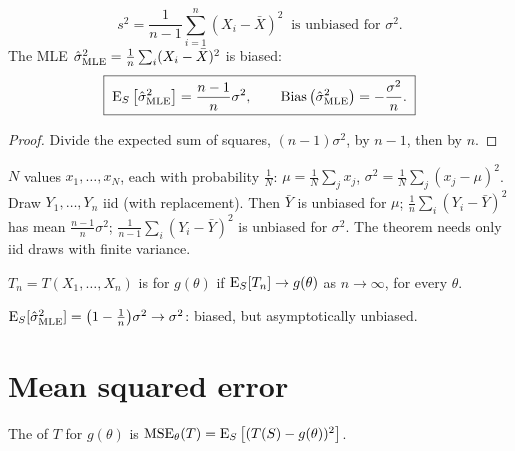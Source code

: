 \begin{corollary}
\[
  \boxed{\;s^2=\frac{1}{n-1}\sum_{i=1}^n(X_i-\bar X)^2\ \text{ is unbiased for }\sigma^2.\;}
\]
The MLE $\hat\sigma^2_{\mathrm{MLE}}=\frac1n\sum_i(X_i-\bar X)^2$ is biased:
\[
  \boxed{\;\operatorname{E}_S\big[\hat\sigma^2_{\mathrm{MLE}}\big]=\frac{n-1}{n}\sigma^2,\qquad\operatorname{Bias}\big(\hat\sigma^2_{\mathrm{MLE}}\big)=-\frac{\sigma^2}{n}.\;}
\]
\end{corollary}
\begin{proof}
Divide the expected sum of squares, $(n-1)\sigma^2$, by $n-1$, then by $n$.
\end{proof}

\begin{example}
$N$ values $x_1,\dots,x_N$, each with probability $\frac1N$: $\mu=\frac1N\sum_jx_j$, $\sigma^2=\frac1N\sum_j(x_j-\mu)^2$. Draw $Y_1,\dots,Y_n$ iid (with replacement). Then $\bar Y$ is unbiased for $\mu$; $\frac1n\sum_i(Y_i-\bar Y)^2$ has mean $\frac{n-1}{n}\sigma^2$; $\frac1{n-1}\sum_i(Y_i-\bar Y)^2$ is unbiased for $\sigma^2$. The theorem needs only iid draws with finite variance.
\end{example}

\begin{definition}
$T_n=T(X_1,\dots,X_n)$ is  for $g(\theta)$ if $\operatorname{E}_S[T_n]\to g(\theta)$ as $n\to\infty$, for every $\theta$.
\end{definition}

$\operatorname{E}_S[\hat\sigma^2_{\mathrm{MLE}}]=\big(1-\frac1n\big)\sigma^2\to\sigma^2$: biased, but asymptotically unbiased.

\section{Mean squared error}

\begin{definition}
The  of $T$ for $g(\theta)$ is $\operatorname{MSE}_\theta(T)=\operatorname{E}_S\big[(T(S)-g(\theta))^2\big]$.
\end{definition}

